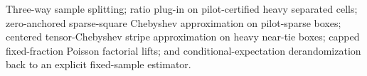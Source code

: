 Three-way sample splitting; ratio plug-in on pilot-certified heavy separated cells; zero-anchored sparse-square Chebyshev approximation on pilot-sparse boxes; centered tensor-Chebyshev stripe approximation on heavy near-tie boxes; capped fixed-fraction Poisson factorial lifts; and conditional-expectation derandomization back to an explicit fixed-sample estimator.